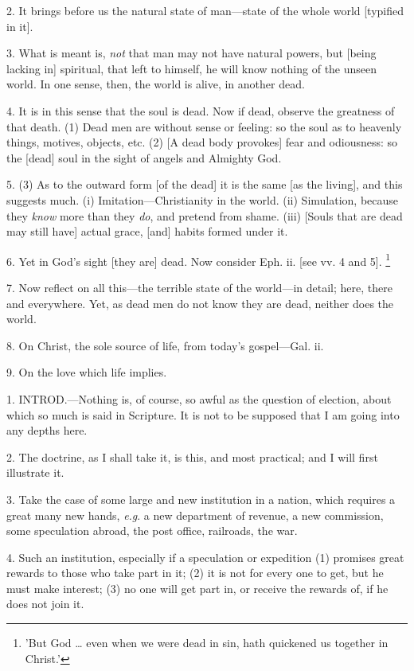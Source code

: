 2. It brings before us the natural state of
man—state of the whole world [typified in it].

3. What is meant is, \emph{not} that man may not
have natural powers, but [being lacking in] spiritual, that left to
himself, he will know nothing of the unseen world. In one sense, then,
the world is alive, in another dead.

4. It is in this sense that the soul is dead. Now
if dead, observe the greatness of that death. (1) Dead men are without
sense or feeling: so the soul as to heavenly things, motives, objects,
etc. (2) [A dead body provokes] fear and odiousness: so the [dead]
soul in the sight of angels and Almighty God.

5. (3) As to the outward form [of the dead] it is
the same [as the living], and this suggests much. (i)
Imitation—Christianity in the world. (ii) Simulation, because they \emph{know}
more than they \emph{do}, and pretend from shame. (iii) [Souls that
are dead may still have] actual grace, [and] habits formed under it.

6. Yet in God's sight [they are] dead. Now
consider Eph. ii. [see vv. 4 and 5]. \footnote{'But God … even when we
were dead in sin, hath quickened us together in Christ.'}

7. Now reflect on all this—the terrible state
of the world—in detail; here, there and everywhere. Yet, as dead men
do not know they are dead, neither does the world.

8. On Christ, the sole source of life, from today's
gospel—Gal. ii.

9. On the love which life implies.


1. INTROD.—Nothing
is, of course, so awful as the question of election, about which so
much is said in Scripture. It is not to be supposed that I am going
into any depths here.

2. The doctrine, as I shall take it, is this, and
most practical; and I will first illustrate it.

3. Take the case of some large and new
institution in a nation, which requires a great many new hands, \emph{e.g}.
a new department of revenue, a new commission, some speculation
abroad, the post office, railroads, the war.

4. Such an institution, especially if a
speculation or expedition (1) promises great rewards to those who take
part in it; (2) it is not for every one to get, but he must make
interest; (3) no one will get part in, or receive the rewards of, if
he does not join it.

